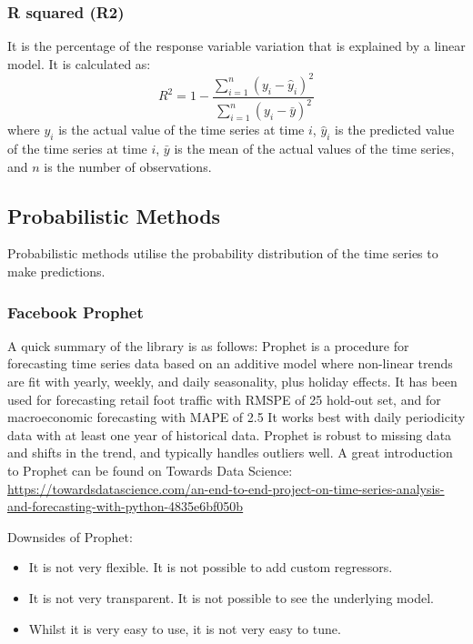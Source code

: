 \documentclass[manuscript,screen,nonacm,11pt]{acmart}
\numberwithin{equation}{section}
\begin{document}
\subsubsection{R squared (R2)}
It is the percentage of the response variable variation that is explained by a linear model. It is calculated as:
\begin{equation}
\label{eq:r2}
R^2 = 1 - \frac{\sum_{i=1}^{n} (y_i - \hat{y}_i)^2}{\sum_{i=1}^{n} (y_i - \bar{y})^2}
\end{equation}
where $y_i$ is the actual value of the time series at time $i$, $\hat{y}_i$ is the predicted value of the time series at time $i$, $\bar{y}$ is the mean of the actual values of the time series, and $n$ is the number of observations.


\subsection{Probabilistic Methods}
Probabilistic methods utilise the probability distribution of the time series to make predictions.

\subsubsection{Facebook Prophet}
A quick summary of the library is as follows: 
    Prophet is a procedure for forecasting time series data based on an additive model 
    where non-linear trends are fit with yearly, weekly, and daily seasonality, plus 
    holiday effects.
    It has been used for forecasting retail foot traffic with RMSPE of 25%
    hold-out set, and for macroeconomic forecasting with MAPE of 2.5%
    It works best with daily periodicity data with at least one year of historical data.
    Prophet is robust to missing data and shifts in the trend, and typically handles outliers
    well.
    A great introduction to Prophet can be found on Towards Data Science:
    \url{https://towardsdatascience.com/an-end-to-end-project-on-time-series-analysis-and-forecasting-with-python-4835e6bf050b}


Downsides of Prophet:
\begin{itemize}
	\item It is not very flexible. It is not possible to add custom regressors.
	\item It is not very transparent. It is not possible to see the underlying model.
	\item Whilst it is very easy to use, it is not very easy to tune.
\end{itemize}
\end{document}
